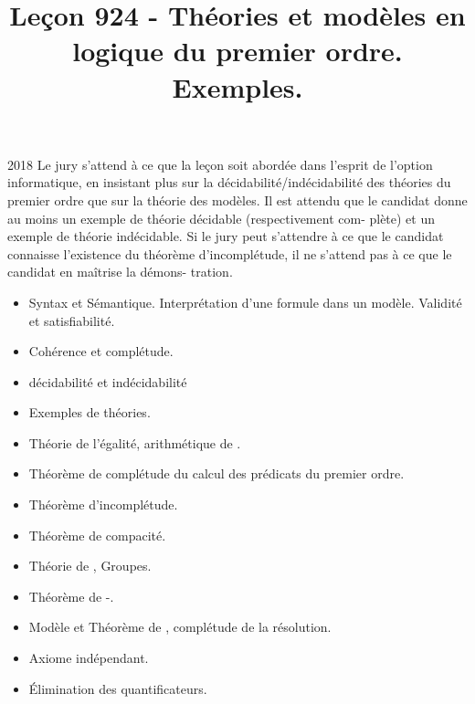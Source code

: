 \documentclass{agregfiche}
\title{Leçon 924 - Théories et modèles en logique du premier ordre. 
Exemples.}
\begin{document}
\maketitle

\secrapports
\begin{rapport}{2018}
    Le jury s’attend à ce que la leçon soit abordée dans l’esprit de 
    l’option informatique, en insistant plus
    sur la décidabilité/indécidabilité des théories du premier ordre 
    que sur la théorie des modèles.
    Il est attendu que le candidat donne au moins un exemple de 
    théorie décidable (respectivement com-
    plète) et un exemple de théorie indécidable. Si le jury peut 
    s’attendre à ce que le candidat connaisse
    l’existence du théorème d’incomplétude, il ne s’attend pas à ce 
    que le candidat en maîtrise la démons-
    tration.
\end{rapport}

\secindispensables

\begin{itemize}
	\item Syntax et Sémantique. Interprétation d’une formule dans un 
	modèle. Validité et satisfiabilité. 
    \item Cohérence et complétude. 
    \item décidabilité et indécidabilité
    \item Exemples de théories.
\end{itemize}





\secasavoir

\begin{itemize}
	\item Théorie de l'égalité, arithmétique de .
    \item  Théorème de complétude du calcul des prédicats du premier 
    ordre.
    \item Théorème d'incomplétude.
    \item Théorème de compacité.
\end{itemize}

\secidees

\begin{itemize}
    \item Théorie de , Groupes.
	\item Théorème de -.
    \item Modèle et Théorème de , complétude de la 
    résolution.
    \item Axiome indépendant.
    \item Élimination des quantificateurs.
\end{itemize}
\end{document}
